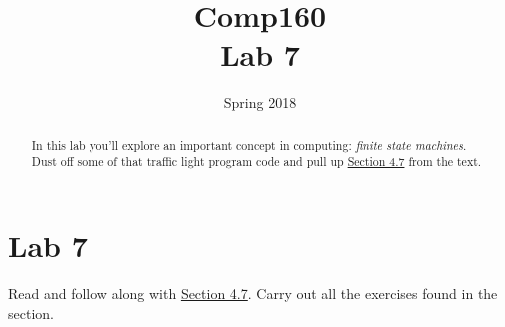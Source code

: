 \documentclass[nobib]{tufte-handout}
\title{Comp160 \\ Lab 7 }
\author{}
\date{ Spring 2018 }
\begin{document}
\maketitle

\begin{abstract}
In this lab you'll explore an important concept in computing: \textit{finite state machines}. Dust off some of that traffic light program code and pull up \href{http://htdp.org/2018-01-06/Book/part_one.html#%28part._sec~3aworlds-more%29}{Section 4.7} from the text.
\end{abstract}

\section*{Lab 7}

Read and follow along with \href{http://htdp.org/2018-01-06/Book/part_one.html#%28part._sec~3aworlds-more%29}{Section 4.7}. Carry out all the exercises found in the section\sidenote{59---62}.
\end{document}
